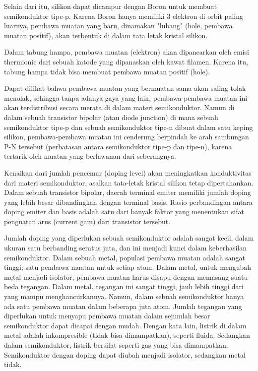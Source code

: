 \documentclass[12pt,a4paper]{article}
\begin{document}
Selain dari itu, silikon dapat dicampur dengan Boron untuk membuat semikonduktor tipe-p. Karena Boron hanya memiliki 3 elektron di orbit paling luarnya, pembawa muatan yang baru, dinamakan "lubang" (hole, pembawa muatan positif), akan terbentuk di dalam tata letak kristal silikon.

Dalam tabung hampa, pembawa muatan (elektron) akan dipancarkan oleh emisi thermionic dari sebuah katode yang dipanaskan oleh kawat filamen. Karena itu, tabung hampa tidak bisa membuat pembawa muatan positif (hole).

Dapat dilihat bahwa pembawa muatan yang bermuatan sama akan saling tolak menolak, sehingga tanpa adanya gaya yang lain, pembawa-pembawa muatan ini akan terdistribusi secara merata di dalam materi semikonduktor. Namun di dalam sebuah transistor bipolar (atau diode junction) di mana sebuah semikonduktor tipe-p dan sebuah semikonduktor tipe-n dibuat dalam satu keping silikon, pembawa-pembawa muatan ini cenderung berpindah ke arah sambungan P-N tersebut (perbatasan antara semikonduktor tipe-p dan tipe-n), karena tertarik oleh muatan yang berlawanan dari seberangnya.

Kenaikan dari jumlah pencemar (doping level) akan meningkatkan konduktivitas dari materi semikonduktor, asalkan tata-letak kristal silikon tetap dipertahankan. Dalam sebuah transistor bipolar, daerah terminal emiter memiliki jumlah doping yang lebih besar dibandingkan dengan terminal basis. Rasio perbandingan antara doping emiter dan basis adalah satu dari banyak faktor yang menentukan sifat penguatan arus (current gain) dari transistor tersebut.

Jumlah doping yang diperlukan sebuah semikonduktor adalah sangat kecil, dalam ukuran satu berbanding seratus juta, dan ini menjadi kunci dalam keberhasilan semikonduktor. Dalam sebuah metal, populasi pembawa muatan adalah sangat tinggi; satu pembawa muatan untuk setiap atom. Dalam metal, untuk mengubah metal menjadi isolator, pembawa muatan harus disapu dengan memasang suatu beda tegangan. Dalam metal, tegangan ini sangat tinggi, jauh lebih tinggi dari yang mampu menghancurkannya. Namun, dalam sebuah semikonduktor hanya ada satu pembawa muatan dalam beberapa juta atom. Jumlah tegangan yang diperlukan untuk menyapu pembawa muatan dalam sejumlah besar semikonduktor dapat dicapai dengan mudah. Dengan kata lain, listrik di dalam metal adalah inkompresible (tidak bisa dimampatkan), seperti fluida. Sedangkan dalam semikonduktor, listrik bersifat seperti gas yang bisa dimampatkan. Semikonduktor dengan doping dapat diubah menjadi isolator, sedangkan metal tidak.
\end{document}
